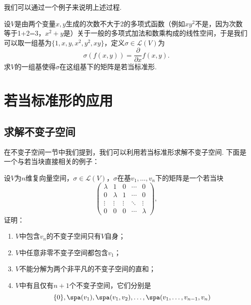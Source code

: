 我们可以通过一个例子来说明上述过程.
\begin{example}
    设$V$是由两个变量$x,y$生成的次数不大于2的多项式函数（例如$xy^2$不是，因为次数等于1+2=3，$x^2+y$是）关于一般的多项式加法和数乘构成的线性空间，于是我们可以取一组基为$\{1,x,y,x^2,y^2,xy\}$，定义$\sigma\in \mathcal{L}(V)$为
    \[\sigma(f(x,y))=\dfrac{\partial}{\partial x}f(x,y).\]
    求$V$的一组基使得$\sigma$在这组基下的矩阵是若当标准形.
\end{example}
\begin{solution}

\end{solution}

\section{若当标准形的应用}
\subsection{求解不变子空间}
在不变子空间一节中我们提到，我们可以利用若当标准形求解不变子空间. 下面是一个与若当块直接相关的例子：
\begin{example}
    设$V$为$n$维复向量空间，$\sigma\in \mathcal{L}(V)$，$\sigma$在基$v_1,\ldots,v_n$下的矩阵是一个若当块
    \[\begin{pmatrix}
        \lambda & 1 & 0 & \cdots & 0 \\
        0 & \lambda & 1 & \cdots & 0 \\
        \vdots & \vdots & \vdots & \ddots & \vdots \\
        0 & 0 & 0 & \cdots & \lambda
    \end{pmatrix},\]
    证明：
    \begin{enumerate}
        \item $V$中包含$v_n$的不变子空间只有$V$自身；

        \item $V$中任意非零不变子空间都包含$v_1$；

        \item $V$不能分解为两个非平凡的不变子空间的直和；

        \item $V$中有且仅有$n+1$个不变子空间，它们分别是
              \[\{0\},\spa(v_1),\spa(v_1,v_2),\ldots,\spa(v_1,\ldots,v_{n-1},v_n)\]
    \end{enumerate}
\end{example}

